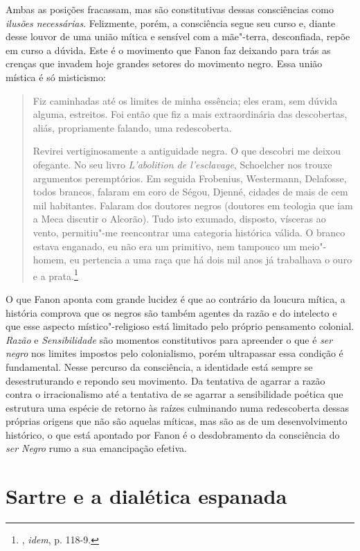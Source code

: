 Ambas as posições fracassam, mas são constitutivas dessas consciências
como \emph{ilusões necessárias}. Felizmente, porém, a consciência segue
seu curso e, diante desse louvor de uma união mítica e sensível com a
mãe"-terra, desconfiada, repõe em curso a dúvida. Este é o movimento que
Fanon faz deixando para trás as crenças que invadem hoje grandes setores
do movimento negro. Essa união mística é só misticismo:

\begin{quote}
Fiz caminhadas até os limites de minha essência; eles eram, sem dúvida
alguma, estreitos. Foi então que fiz a mais extraordinária das
descobertas, aliás, propriamente falando, uma redescoberta.

Revirei vertiginosamente a antiguidade negra. O que descobri me deixou
ofegante. No seu livro \emph{L'abolition de l'esclavage}, Schoelcher nos
trouxe argumentos peremptórios. Em seguida Frobenius, Westermann,
Delafosse, todos brancos, falaram em coro de Ségou, Djenné, cidades de
mais de cem mil habitantes. Falaram dos doutores negros (doutores em
teologia que iam a Meca discutir o Alcorão). Tudo isto exumado,
disposto, vísceras ao vento, permitiu"-me reencontrar uma categoria
histórica válida. O branco estava enganado, eu não era um primitivo, nem
tampouco um meio"-homem, eu pertencia a uma raça que há dois mil anos já
trabalhava o ouro e a prata.\footnote{, \emph{idem}, p. 118-9.}
\end{quote}

O que Fanon aponta com grande lucidez é que ao contrário da loucura
mítica, a história comprova que os negros são também agentes da razão e
do intelecto e que esse aspecto místico"-religioso está limitado pelo
próprio pensamento colonial. \emph{Razão} e \emph{Sensibilidade} são
momentos constitutivos para apreender o que é \emph{ser negro} nos
limites impostos pelo colonialismo, porém ultrapassar essa condição é
fundamental. Nesse percurso da consciência, a identidade está sempre se
desestruturando e repondo seu movimento. Da tentativa de agarrar a razão
contra o irracionalismo até a tentativa de se agarrar a sensibilidade
poética que estrutura uma espécie de retorno às raízes culminando numa
redescoberta dessas próprias origens que não são aquelas míticas, mas
são as de um desenvolvimento histórico, o que está apontado por Fanon é
o desdobramento da consciência do \emph{ser Negro} rumo a sua
emancipação efetiva.

\chapter{Sartre e a dialética espanada}

